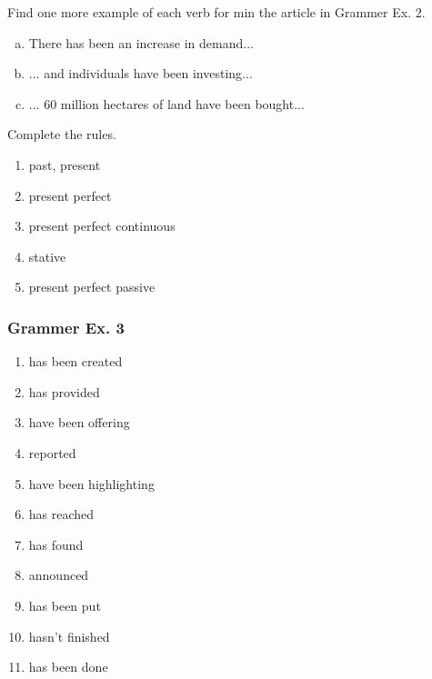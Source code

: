 \documentclass[12pt, a4paper, oneside]{article}
\begin{document}
  Find one more example of each verb for min the article in Grammer Ex. 2.
  \begin{enumerate}[a.)]
    \item There has been an increase in demand...
    \item ... and individuals have been investing...
    \item ... 60 million hectares of land have been bought...
  \end{enumerate}

  Complete the rules.
  \begin{enumerate}[1.]
    \item past, present
    \item present perfect
    \item present perfect continuous
    \item stative
    \item present perfect passive
  \end{enumerate}

  \subsubsection{Grammer Ex. 3}
  \begin{enumerate}[1.]
    \item has been created
    \item has provided
    \item have been offering
    \item reported
    \item have been highlighting
    \item has reached
    \item has found
    \item announced
    \item has been put
    \item hasn't finished
    \item has been done
  \end{enumerate}

  
\end{document}
